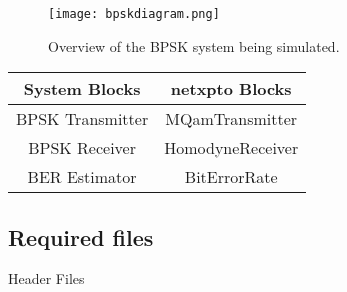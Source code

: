\begin{figure}[h]
\centering
\texttt{[image: bpskdiagram.png]}
\caption{Overview of the BPSK system being simulated.}
\label{fig:homodynesystem}
\end{figure}

\begin{table}[H]
\centering
\begin{tabular}{c|c}
System Blocks    & netxpto Blocks   \\ \hline
BPSK Transmitter & MQamTransmitter  \\
BPSK Receiver    & HomodyneReceiver \\
BER Estimator    & BitErrorRate
\end{tabular}
\end{table}

\subsection*{Required files}\label{Required files}

Header Files

